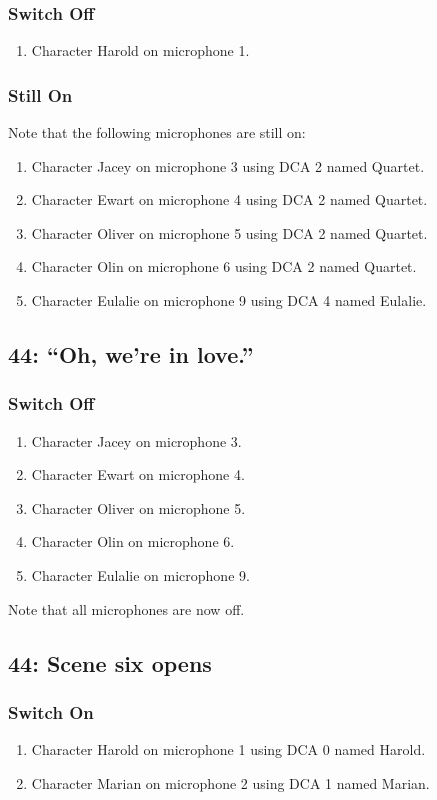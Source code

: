 \subsubsection* {Switch Off}
\begin{enumerate}
\item Character Harold on microphone 1.
\end{enumerate}
\subsubsection* {Still On}
Note that the following microphones are still on:
\begin{enumerate}
\item Character Jacey on microphone 3 using DCA 2 named Quartet.
\item Character Ewart on microphone 4 using DCA 2 named Quartet.
\item Character Oliver on microphone 5 using DCA 2 named Quartet.
\item Character Olin on microphone 6 using DCA 2 named Quartet.
\item Character Eulalie on microphone 9 using DCA 4 named Eulalie.
\end{enumerate}
\subsection* {44: ``Oh, we're in love.''}
\subsubsection* {Switch Off}
\begin{enumerate}
\item Character Jacey on microphone 3.
\item Character Ewart on microphone 4.
\item Character Oliver on microphone 5.
\item Character Olin on microphone 6.
\item Character Eulalie on microphone 9.
\end{enumerate}
Note that all microphones are now off.
\subsection* {44: Scene six opens}
\subsubsection* {Switch On}
\begin{enumerate}
\item Character Harold on microphone 1 using DCA 0 named Harold.
\item Character Marian on microphone 2 using DCA 1 named Marian.
\end{enumerate}
